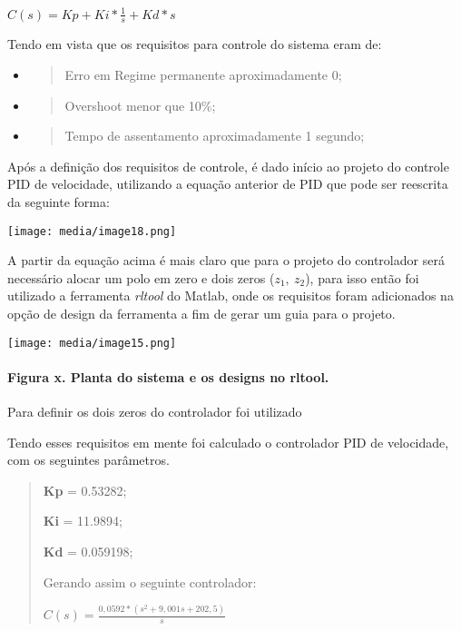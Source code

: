 \documentclass[]{article}
\let\oldparagraph\paragraph
\renewcommand{\paragraph}[1]{\oldparagraph{#1}\mbox{}}
\begin{document}
\(C(s) = Kp + Ki*\frac{1}{s} + Kd*s\)

Tendo em vista que os requisitos para controle do sistema eram de:

\begin{itemize}
\item
  \begin{quote}
  Erro em Regime permanente aproximadamente 0;
  \end{quote}
\item
  \begin{quote}
  Overshoot menor que 10\%;
  \end{quote}
\item
  \begin{quote}
  Tempo de assentamento aproximadamente 1 segundo;
  \end{quote}
\end{itemize}

Após a definição dos requisitos de controle, é dado início ao projeto do
controle PID de velocidade, utilizando a equação anterior de PID que
pode ser reescrita da seguinte forma:

\texttt{[image: media/image18.png]}

A partir da equação acima é mais claro que para o projeto do controlador
será necessário alocar um polo em zero e dois zeros (\(z_{1},\ z_{2}\)),
para isso então foi utilizado a ferramenta \emph{rltool} do Matlab, onde
os requisitos foram adicionados na opção de design da ferramenta a fim
de gerar um guia para o projeto.

\texttt{[image: media/image15.png]}

\paragraph{Figura x. Planta do sistema e os designs no
rltool.}\label{figura-x.-planta-do-sistema-e-os-designs-no-rltool.}

Para definir os dois zeros do controlador foi utilizado

Tendo esses requisitos em mente foi calculado o controlador PID de
velocidade, com os seguintes parâmetros.

\begin{quote}
\textbf{Kp} = 0.53282;

\textbf{Ki} = 11.9894;

\textbf{Kd} = 0.059198;

Gerando assim o seguinte controlador:

\(C(s) = \frac{0,0592*(s^{2} + 9,001s + 202,5)}{s}\)
\end{quote}
\end{document}
